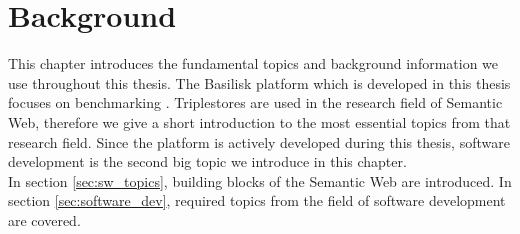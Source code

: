 \chapter{Background}
\label{ch:background}

This chapter introduces the fundamental topics and background information we use throughout this thesis.
The Basilisk platform which is developed in this thesis focuses on benchmarking \tsp{}.
Triplestores are used in the research field of Semantic Web, therefore we give a short introduction to the most essential topics from that research field.
Since the platform is actively developed during this thesis, software development is the second big topic we introduce in this chapter.
\\

In section \ref{sec:sw_topics}, building blocks of the Semantic Web are introduced.
In section \ref{sec:software_dev}, required topics from the field of software development are covered.





